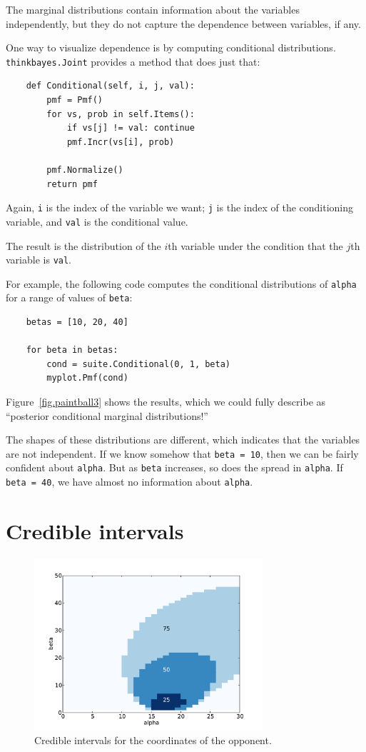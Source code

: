\documentclass[12pt]{book}
\begin{document}
The marginal distributions contain information about the variables
independently, but they do not capture the dependence between
variables, if any.

One way to visualize dependence is by computing conditional
distributions.  {\tt thinkbayes.Joint} provides a method that
does just that:

\begin{verbatim}
    def Conditional(self, i, j, val):
        pmf = Pmf()
        for vs, prob in self.Items():
            if vs[j] != val: continue
            pmf.Incr(vs[i], prob)

        pmf.Normalize()
        return pmf
\end{verbatim}

Again, {\tt i} is the index of the variable we want; {\tt j}
is the index of the conditioning variable, and {\tt val} is the
conditional value.

The result is the distribution of the $i$th variable under the
condition that the $j$th variable is {\tt val}.

For example, the following code computes the conditional distributions
of {\tt alpha} for a range of values of {\tt beta}:

\begin{verbatim}
    betas = [10, 20, 40]

    for beta in betas:
        cond = suite.Conditional(0, 1, beta)
        myplot.Pmf(cond)
\end{verbatim}

Figure~\ref{fig.paintball3} shows the results, which we could
fully describe as ``posterior conditional marginal distributions!''

The shapes of these distributions are different, which indicates
that the variables are not independent.  If we know somehow that
{\tt beta = 10}, then we can be fairly confident about {\tt alpha}.
But as {\tt beta} increases, so does the spread in {\tt alpha}.
If {\tt beta = 40}, we have almost no information about {\tt alpha}.


\section{Credible intervals}

\begin{figure}
\centerline{\includegraphics[height=2.5in]{figs/paintball5.pdf}}
\caption{Credible intervals for the coordinates of the opponent.}
\label{fig.paintball5}
\end{figure}
\end{document}
